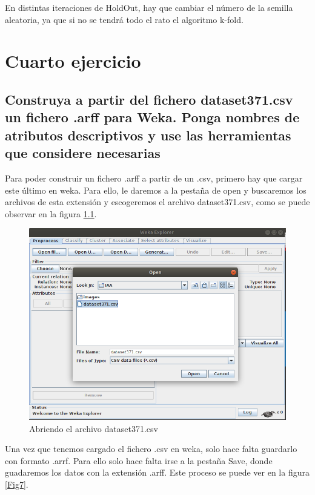 \documentclass[11pt,twoside,a4paper]{book}
\begin{document}
En distintas iteraciones de HoldOut, hay que cambiar el número de la semilla aleatoria,
ya que si no se tendrá todo el rato el algoritmo k-fold.

\chapter{Cuarto ejercicio}
\section{Construya a partir del fichero dataset371.csv un \break fichero .arff para Weka. Ponga nombres de
\break atributos descriptivos y use las herramientas que \break considere necesarias}
Para poder construir un fichero .arff a partir de un .csv, primero hay que cargar
este último en weka. Para ello, le daremos a la pestaña de open y buscaremos los
archivos de esta extensión y escogeremos el archivo dataset371.csv, como se puede
observar en la figura \ref{Fig6}.

\begin{figure}[H]
   \begin{center}
	     \includegraphics[scale=1]{ejercicio4_1.png}
   \end{center}
	\caption{Abriendo el archivo dataset371.csv}
	\label{Fig6}
\end{figure}

Una vez que tenemos cargado el fichero .csv en weka, solo hace falta guardarlo con
formato .arrf. Para ello solo hace falta irse a la pestaña Save, donde guadaremos
los datos con la extensión .arff. Este proceso se puede ver en la figura \ref{Fig7}.
\end{document}
